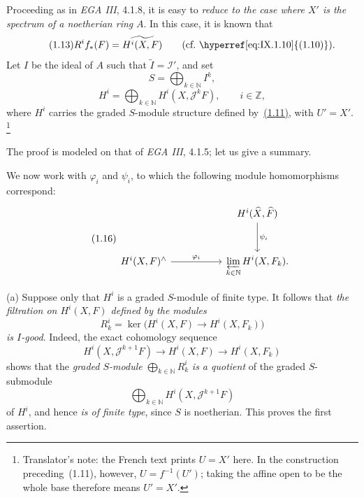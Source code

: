 Proceeding as in \emph{EGA III}, 4.1.8, it is easy to \emph{reduce to the case
where $X'$ is the spectrum of a noetherian ring} $A$. In this case, it is
known that
\begin{equation}
\tag{1.13}\label{eq:IX.1.13}
R^i f_*(F)=\widetilde{H^i(X,F)}
\qquad\text{(cf.~\hyperref[eq:IX.1.10]{(1.10)}).}
\end{equation}
Let $I$ be the ideal of $A$ such that $\widetilde I=\mathcal I'$, and set
\begin{equation}
\tag{1.14}\label{eq:IX.1.14}
S=\bigoplus_{k\in\mathbb N}I^k,
\end{equation}
\begin{equation}
\tag{1.15}\label{eq:IX.1.15}
H^i=\bigoplus_{k\in\mathbb N}H^i(X,\mathcal J^kF),
\qquad i\in\mathbb Z,
\end{equation}
where $H^i$ carries the graded $S$-module structure defined by~\hyperref[eq:IX.1.11]{(1.11)}, with
$U'=X'$.
\footnote{Translator's note: the French text prints $U=X'$ here.
In the construction preceding~(1.11), however, $U=f^{-1}(U')$; taking
the affine open to be the whole base therefore means $U'=X'$.}

The proof is modeled on that of \emph{EGA III}, 4.1.5; let us give a summary.

We now work with $\varphi_i$ and $\psi_i$, to which the following module
homomorphisms correspond:
\begin{equation}
\tag{1.16}\label{eq:IX.1.16}
\begin{tikzcd}[column sep=5.2em,row sep=3.0em]
& H^i(\widehat X,\widehat F)
    \arrow[d,"\psi_i"] \\
H^i(X,F)^{\wedge}
    \arrow[r,"\varphi_i"]
& \displaystyle\varprojlim_{k\in\mathbb N}H^i(X,F_k).
\end{tikzcd}
\end{equation}

\noindent\textup{(a)} Suppose only that $H^i$ is a graded $S$-module of finite
type. It follows that \emph{the filtration on $H^i(X,F)$ defined by the
modules}
\begin{equation}
\tag{1.17}\label{eq:IX.1.17}
R_k^i=\ker\bigl(H^i(X,F)\longrightarrow H^i(X,F_k)\bigr)
\end{equation}
\emph{is $I$-good}. Indeed, the exact cohomology sequence
\begin{equation}
\tag{1.18}\label{eq:IX.1.18}
H^i(X,\mathcal J^{k+1}F)\longrightarrow H^i(X,F)
  \longrightarrow H^i(X,F_k)
\end{equation}
shows that the \emph{graded $S$-module}
$\bigoplus_{k\in\mathbb N}R_k^i$ \emph{is a quotient} of the graded
$S$-submodule
\[
\bigoplus_{k\in\mathbb N}H^i(X,\mathcal J^{k+1}F)
\]
of $H^i$, and hence \emph{is of finite type}, since $S$ is noetherian. This
proves the first assertion.

